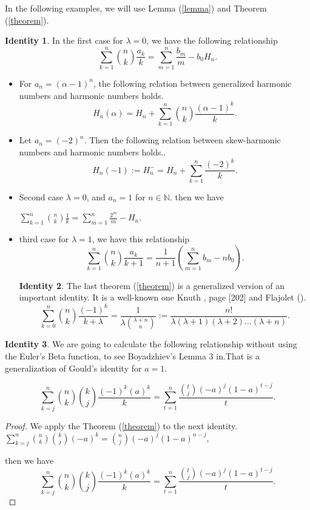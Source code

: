 \documentclass[a4paper,10pt,oneside]{article}
\newcommand{\BBN}{{\mathbb N}}
\theoremstyle{definition}
\newtheorem{identity2}{Identity}[section]
\theoremstyle{remark}
\newcommand{\idi}[1]{\begin{identity2}{#1}\end{identity2}}
\begin{document}
In the following examples, we will use Lemma (\ref{lemma}) and Theorem (\ref{theorem}).


\idi{In the first case for $\lambda=0$, we have the following relationship
$$\sum_{k=1}^n\binom{n}{k}\frac{a_k}{k}=%
\sum_{m=1}^n\frac{b_m}{m}-b_0H_n.$$}

\begin{itemize}
\item 
For $a_n = (\alpha - 1)^n$, the following relation between generalized harmonic numbers and harmonic numbers holds.
$$H_n(\alpha)=H_n+\sum_{k=1}^n\binom{n}{k}\frac{(\alpha-1)^k}{k}.$$
\item Let $a_n = (-2)^n$. Then the following relation between skew-harmonic numbers and harmonic numbers holds..
$$H_n(-1):=H_n^-=H_n+\sum_{k=1}^n\frac{(-2)^k}{k}.$$
\end{itemize}
\begin{itemize}
 \item Second case  $\lambda=0$, and  $a_n=1$ for $n\in \BBN.$ then we have\par
$\sum_{k=1}^n\binom{n}{k}\frac{1}{k}=\sum_{m=1}^n \frac{2^m}{m}-H_n.$ %
\item third case for $\lambda=1$, we have this relationship
$$\sum_{k=1}^n\binom{n}{k}\frac{a_k}{k+1}=\frac{1}{n+1}\left( \sum_{m=1}^nb_m-nb_0\right).$$
 \idi{ The last theorem (\ref{theorem}) is a generalized version of an important identity. It is a well-known one Knuth \cite{knuth}, page [202] and Flajolet (\cite{flajolet}).
   $$ \sum_{k=0}^n\binom{n}{k}\frac{(-1)^{k}}{k+\lambda}=\frac{1}{\lambda\binom{\lambda+n}{n}}:=\frac{n!}{\lambda(\lambda+1)(\lambda+2)\dots(\lambda+n)}.$$}
 

\end{itemize}
\idi{ We are going to calculate the following relationship without using the Euler's Beta function, \label{app1}
to see  Boyadzhiev's Lemma 3 in\cite{khristo2}.That is a generalization of Gould's identity for $a=1.$

\begin{equation}
 \sum_{k=j}^n\binom{n}{k}\binom{k}{j}\frac{(-1)^k(a)^{k}}{k}=\sum_{t=1}^n\frac{\binom{t}{j}(-a)^j\left(1-a\right)^{t-j}}{t}.\label{eulerbnew}
\end{equation}

\begin{proof}

 We apply   the  Theorem (\ref{theorem})  to the next identity.
 $ \sum_{k=j}^n\binom{n}{k}\binom{k}{j}{(-a)^{k}}=\binom{n}{j}(-a)^j\left(1-a\right)^{n-j},$
  
  then we have 
 \begin{equation}
 \sum_{k=j}^n\binom{n}{k}\binom{k}{j}\frac{(-1)^k(a)^{k}}{k}=\sum_{t=1}^n\frac{\binom{t}{j}(-a)^j\left(1-a\right)^{t-j}}{t}.\label{eulerbnew2}
\end{equation}

  
 \end{proof}}
\end{document}

